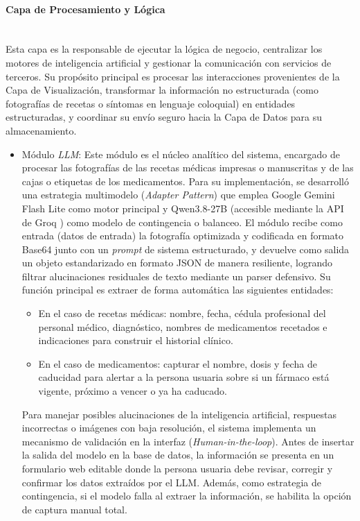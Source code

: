 \paragraph{Capa de Procesamiento y Lógica} \leavevmode \\
Esta capa es la responsable de ejecutar la lógica de negocio, centralizar los motores de inteligencia artificial y gestionar la comunicación con servicios de terceros. Su propósito principal es procesar las interacciones provenientes de la Capa de Visualización, transformar la información no estructurada (como fotografías de recetas o síntomas en lenguaje coloquial) en entidades estructuradas, y coordinar su envío seguro hacia la Capa de Datos para su almacenamiento.
\begin{itemize}
        \item Módulo \emph{LLM}: Este módulo es el núcleo analítico del sistema, encargado de procesar las fotografías de las recetas médicas impresas o manuscritas y de las cajas o etiquetas de los medicamentos. Para su implementación, se desarrolló una estrategia multimodelo (\emph{Adapter Pattern}) que emplea Google Gemini Flash Lite \cite{geminiapi} como motor principal y Qwen3.8-27B (accesible mediante la API de Groq \cite{CostoGroq}) como modelo de contingencia o balanceo. El módulo recibe como entrada (datos de entrada) la fotografía optimizada y codificada en formato Base64 junto con un \emph{prompt} de sistema estructurado, y devuelve como salida un objeto estandarizado en formato JSON de manera resiliente, logrando filtrar alucinaciones residuales de texto mediante un parser defensivo. Su función principal es extraer de forma automática las siguientes entidades:
        \begin{itemize}
            \item En el caso de recetas médicas: nombre, fecha, cédula profesional del personal médico, diagnóstico, nombres de medicamentos recetados e indicaciones para construir el historial clínico.
            \item En el caso de medicamentos: capturar el nombre, dosis y fecha de caducidad para alertar a la persona usuaria sobre si un fármaco está vigente, próximo a vencer o ya ha caducado.
        \end{itemize}

        Para manejar posibles alucinaciones de la inteligencia artificial, respuestas incorrectas o imágenes con baja resolución, el sistema implementa un mecanismo de validación en la interfaz (\emph{Human-in-the-loop}). Antes de insertar la salida del modelo en la base de datos, la información se presenta en un formulario web editable donde la persona usuaria debe revisar, corregir y confirmar los datos extraídos por el LLM. Además, como estrategia de contingencia, si el modelo falla al extraer la información, se habilita la opción de captura manual total.
        

\end{itemize}
